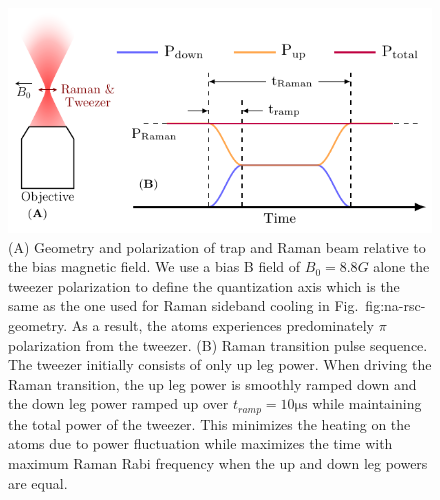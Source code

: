 \begin{figure}
  \centering
  \includegraphics[width=\textwidth]{figures/raman_spectroscopy_apparatus_sequence.pdf}
  \caption[Raman transition setup and sequence]{
    (A) Geometry and polarization of trap and Raman beam relative to the bias magnetic field.
    We use a bias B field of $B_0=8.8 G$ alone the tweezer polarization
    to define the quantization axis
    which is the same as the one used for Raman sideband cooling in Fig.~{fig:na-rsc-geometry}.
    As a result, the atoms experiences predominately $\pi$ polarization from the tweezer.
    (B) Raman transition pulse sequence.
    The tweezer initially consists of only up leg power.
    When driving the Raman transition, the up leg power is smoothly ramped down and
    the down leg power ramped up over $t_{ramp}=10\mathrm{\mu s}$
    while maintaining the total power of the tweezer.
    This minimizes the heating on the atoms due to power fluctuation while maximizes the time
    with maximum Raman Rabi frequency when the up and down leg powers are equal.
    \label{fig:raman-spectroscopy:apparatus-sequence}}
\end{figure}

